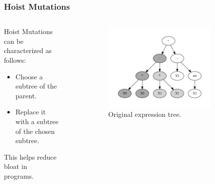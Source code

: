 \documentclass{beamer}
\begin{document}
\begin{frame}
  \frametitle{Hoist Mutations}
  \begin{columns}
    \begin{column}{0.33\textwidth}
      Hoist Mutations can be characterized as follows:
      \begin{itemize}
        \item Choose a subtree of the parent. 
        \item Replace it with a subtree of the chosen subtree.
      \end{itemize}
      This helps reduce bloat in programs.
    \end{column}
    \begin{column}{0.6\textwidth}
      \begin{figure}
        \centering
        \begin{subfigure}{0.6\textwidth}
          \centering
          \includegraphics[scale=0.23]{images/graphviz/hoist_mut_before.dot.pdf}
          \caption{Original expression tree.}
          \label{fig:hoist_muta}
        \end{subfigure}%
        \\
        \begin{subfigure}{0.6\textwidth}
          \centering

\end{subfigure}
\end{figure}
\end{column}
\end{columns}
\end{frame}
\end{document}
